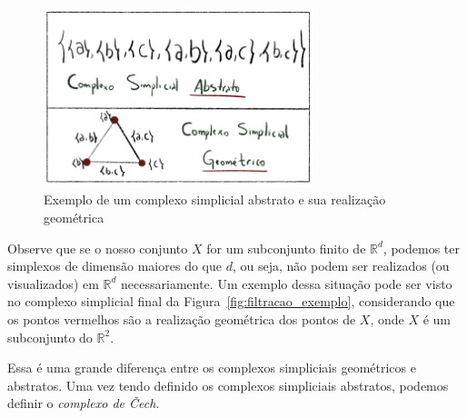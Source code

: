 \begin{figure}[!htpb]
  \centering
  \includegraphics[width=0.7\textwidth]{images/abs_real.png}
  \caption{Exemplo de um complexo simplicial abstrato e sua realização geométrica}
  \label{fig:abs_real}
  \fautor
\end{figure}
Observe que se o nosso conjunto $X$ for um subconjunto finito de $\mathbb{R}^d$,
podemos ter simplexos de dimensão maiores do que $d$, ou seja, não podem ser
realizados (ou visualizados) em $\mathbb{R}^d$ necessariamente. Um exemplo dessa
situação pode ser visto no complexo simplicial final da Figura~\ref{fig:filtracao_exemplo},
considerando que os pontos vermelhos são a realização geométrica dos pontos de $X$,
onde $X$ é um subconjunto do $\mathbb{R}^2$.

Essa é uma grande diferença entre os complexos simpliciais geométricos e abstratos.
Uma vez tendo definido os complexos simpliciais abstratos, podemos definir o
\textit{complexo de \v{C}ech}.


